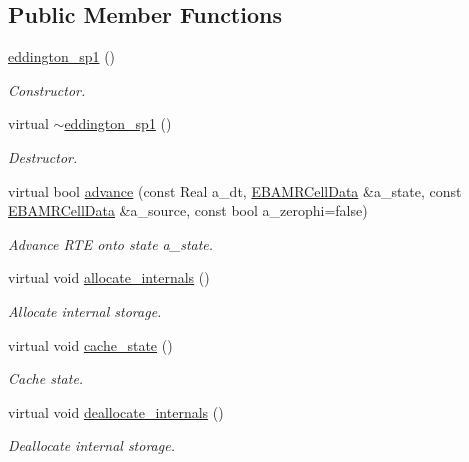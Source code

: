 \subsection*{Public Member Functions}
\begin{DoxyCompactItemize}
\item 
\hyperlink{classeddington__sp1_a94476bc76612cd6a49fe9e2a46a0da98}{eddington\+\_\+sp1} ()
\begin{DoxyCompactList}\small\item\em Constructor. \end{DoxyCompactList}\item 
virtual \hyperlink{classeddington__sp1_aa66154121888c412e86456a617dcc011}{$\sim$eddington\+\_\+sp1} ()
\begin{DoxyCompactList}\small\item\em Destructor. \end{DoxyCompactList}\item 
virtual bool \hyperlink{classeddington__sp1_a867d44eea0818e4c70f770bf0475ad33}{advance} (const Real a\+\_\+dt, \hyperlink{type__definitions_8H_a7e610f301989e5e07781c5e338bdb7c3}{E\+B\+A\+M\+R\+Cell\+Data} \&a\+\_\+state, const \hyperlink{type__definitions_8H_a7e610f301989e5e07781c5e338bdb7c3}{E\+B\+A\+M\+R\+Cell\+Data} \&a\+\_\+source, const bool a\+\_\+zerophi=false)
\begin{DoxyCompactList}\small\item\em Advance R\+TE onto state a\+\_\+state. \end{DoxyCompactList}\item 
virtual void \hyperlink{classeddington__sp1_aad56467469b1a5ca0951bb4ef62b9371}{allocate\+\_\+internals} ()
\begin{DoxyCompactList}\small\item\em Allocate internal storage. \end{DoxyCompactList}\item 
virtual void \hyperlink{classeddington__sp1_afd239af8589fd6540539a78ae9566b2c}{cache\+\_\+state} ()
\begin{DoxyCompactList}\small\item\em Cache state. \end{DoxyCompactList}\item 
virtual void \hyperlink{classeddington__sp1_ab501afc538facf8794c08f2828fe86d2}{deallocate\+\_\+internals} ()
\begin{DoxyCompactList}\small\item\em Deallocate internal storage. \end{DoxyCompactList}\item 

\end{DoxyCompactItemize}
